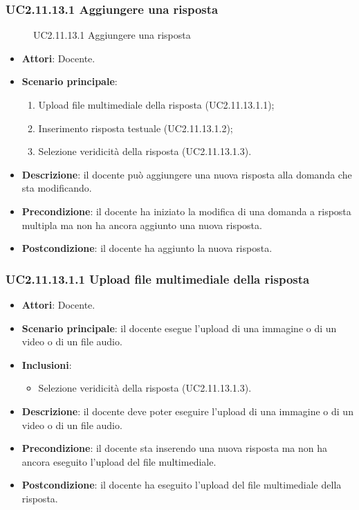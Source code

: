 \subsubsection{UC2.11.13.1 Aggiungere una risposta}
\begin{figure}[H]
\centering
\noindent{}
\caption{UC2.11.13.1 Aggiungere una risposta}
\end{figure}
\begin{itemize}
\item \textbf{Attori}: Docente.
\item \textbf{Scenario principale}:
\begin{enumerate}
\item Upload file multimediale della risposta (UC2.11.13.1.1);
\item Inserimento risposta testuale (UC2.11.13.1.2);
\item Selezione veridicità della risposta (UC2.11.13.1.3).
\end{enumerate}
\item \textbf{Descrizione}: il docente può aggiungere una nuova risposta alla domanda che sta modificando.
\item \textbf{Precondizione}: il docente ha iniziato la modifica di una domanda a risposta multipla ma non ha ancora aggiunto una nuova risposta.
\item \textbf{Postcondizione}: il docente ha aggiunto la nuova risposta.
\end{itemize}
\subsubsection{UC2.11.13.1.1 Upload file multimediale della risposta}
\begin{itemize}
\item \textbf{Attori}: Docente.
\item \textbf{Scenario principale}: il docente esegue l'upload di una immagine o di un video o di un file audio.
\item \textbf{Inclusioni}:
\begin{itemize}
\item Selezione veridicità della risposta (UC2.11.13.1.3).
\end{itemize}
\item \textbf{Descrizione}: il docente deve poter eseguire l'upload di una immagine o di un video o di un file audio.
\item \textbf{Precondizione}: il docente sta inserendo una nuova risposta  ma non ha ancora eseguito l'upload del file multimediale.
\item \textbf{Postcondizione}: il docente ha eseguito l'upload del file multimediale della risposta.
\end{itemize}

